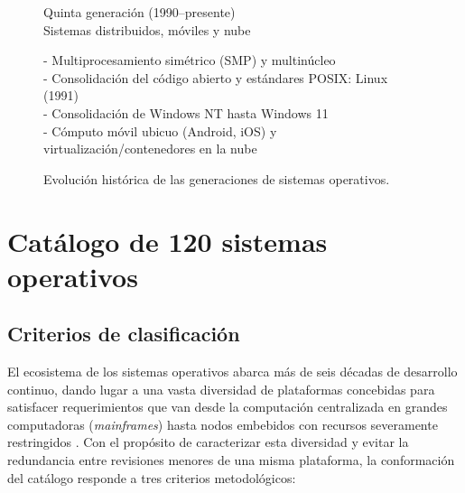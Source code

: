 \documentclass[12pt]{article}
\begin{document}
\begin{figure}[htbp]
{\begin{localsubgroup}
    Quinta generación (1990--presente) \\ Sistemas distribuidos, móviles y nube
    \begin{localsubgroup}
        - Multiprocesamiento simétrico (SMP) y multinúcleo \\
        - Consolidación del código abierto y estándares POSIX: Linux (1991) \\
        - Consolidación de Windows NT hasta Windows 11 \\
        - Cómputo móvil ubicuo (Android, iOS) y virtualización/contenedores en la nube
    \end{localsubgroup}
\end{localsubgroup}%
}
\caption{Evolución histórica de las generaciones de sistemas operativos.}
\label{fig:cuadroEvolucionSo}
\end{figure}

\section{Catálogo de 120 sistemas operativos}\label{sec:catalogo120So}

\subsection{Criterios de clasificación}\label{sec:criteriosClasificacion}

El ecosistema de los sistemas operativos abarca más de seis décadas de desarrollo continuo, dando lugar a una vasta diversidad de plataformas concebidas para satisfacer requerimientos que van desde la computación centralizada en grandes computadoras (\textit{mainframes}) hasta nodos embebidos con recursos severamente restringidos \parencite[\S 1.3, p.\ 7]{deitel2004operating}. Con el propósito de caracterizar esta diversidad y evitar la redundancia entre revisiones menores de una misma plataforma, la conformación del catálogo responde a tres criterios metodológicos:
\end{document}
